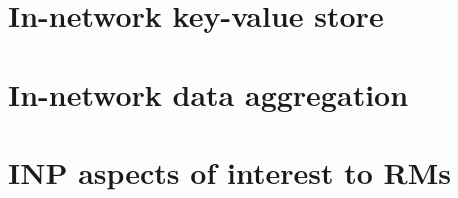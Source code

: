 

\section{In-network key-value store}


\section{In-network data aggregation}


\section{INP aspects of interest to RMs}
